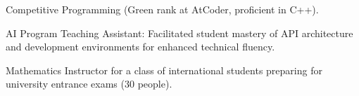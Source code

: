 

\begin{cvparagraph}

\begin{cvbullets}
    \item Competitive Programming (Green rank at AtCoder, proficient in C++).
    \item AI Program Teaching Assistant: Facilitated student mastery of API architecture and development environments for enhanced technical fluency.
    \item Mathematics Instructor for a class of international students preparing for university entrance exams (30 people).
\end{cvbullets}
\end{cvparagraph}
